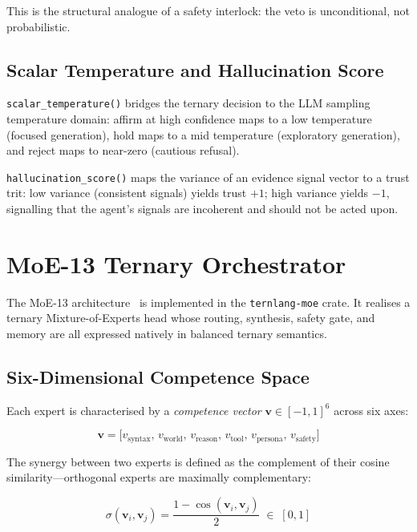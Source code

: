 \documentclass[journal,10pt,twocolumn]{IEEEtran}
\begin{document}
This is the structural analogue of a safety interlock: the veto is
unconditional, not probabilistic.

\subsection{Scalar Temperature and Hallucination Score}

\texttt{scalar\_temperature()} bridges the ternary decision to the LLM
sampling temperature domain: affirm at high confidence maps to a low
temperature (focused generation), hold maps to a mid temperature
(exploratory generation), and reject maps to near-zero (cautious refusal).

\texttt{hallucination\_score()} maps the variance of an evidence signal
vector to a trust trit: low variance (consistent signals) yields trust $+1$;
high variance yields $-1$, signalling that the agent's signals are
incoherent and should not be acted upon.

\section{MoE-13 Ternary Orchestrator}
\label{sec:moe}

The MoE-13 architecture~\cite{moe13_2026} is implemented in the
\texttt{ternlang-moe} crate. It realises a ternary Mixture-of-Experts head
whose routing, synthesis, safety gate, and memory are all expressed natively
in balanced ternary semantics.

\subsection{Six-Dimensional Competence Space}

Each expert is characterised by a \emph{competence vector}
$\mathbf{v} \in [-1,1]^6$ across six axes:

\begin{equation}
  \mathbf{v} = \bigl[
    v_\text{syntax},\,
    v_\text{world},\,
    v_\text{reason},\,
    v_\text{tool},\,
    v_\text{persona},\,
    v_\text{safety}
  \bigr]
  \label{eq:competence}
\end{equation}

The synergy between two experts is defined as the complement of their cosine
similarity—orthogonal experts are maximally complementary:

\begin{equation}
  \sigma(\mathbf{v}_i, \mathbf{v}_j)
    = \frac{1 - \cos(\mathbf{v}_i, \mathbf{v}_j)}{2}
    \;\in\; [0, 1]
  \label{eq:synergy}
\end{equation}
\end{document}

